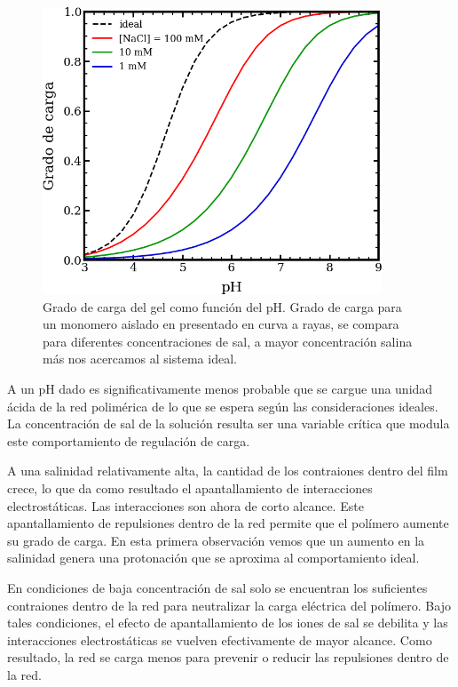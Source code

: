 \begin{figure}
    \centering
    \includegraphics[width=0.9\textwidth]{Figures/graph-film/charge_degree-film.png}
    \caption{Grado de carga del gel como funci\'on del pH. Grado de carga para un monomero aislado en presentado en curva a rayas, se compara para diferentes concentraciones de sal, a mayor concentraci\'on salina m\'as nos acercamos al sistema ideal.}
    \label{fig:film:degree-film}
\end{figure}



A un pH dado es significativamente menos probable que se cargue una unidad \'acida de la red polim\'erica de lo que se espera seg\'un las consideraciones ideales. La concentraci\'on de sal de la soluci\'on resulta ser una variable cr\'itica que modula este comportamiento de regulaci\'on de carga.

A una salinidad relativamente alta, la cantidad de los contraiones dentro del film crece, lo que da como resultado el apantallamiento de interacciones electrost\'aticas. Las interacciones son ahora de corto alcance. Este apantallamiento de repulsiones dentro de la red permite que el pol\'imero aumente su grado de carga. En esta primera observaci\'on vemos que un aumento en la salinidad genera una protonaci\'on que se aproxima al comportamiento ideal. 

En condiciones de baja concentraci\'on de sal solo se encuentran los suficientes contraiones dentro de la red para neutralizar la carga el\'ectrica del pol\'imero. Bajo tales condiciones, el efecto de apantallamiento de los iones de sal se debilita y las interacciones electrost\'aticas se vuelven efectivamente de mayor alcance. Como resultado, la red se carga menos para prevenir o reducir las repulsiones dentro de la red.


